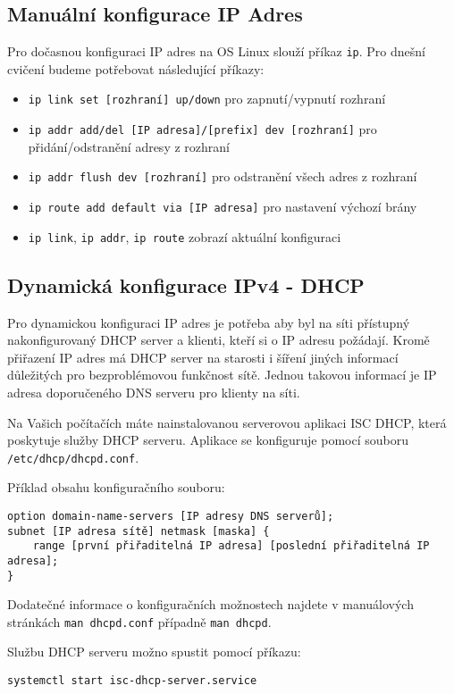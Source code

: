 \subsection{Manuální konfigurace IP Adres}\label{ip-manual}
Pro dočasnou konfiguraci IP adres na OS Linux slouží příkaz {\tt ip}. Pro
dnešní cvičení budeme potřebovat následující příkazy:
\begin{itemize}
    \item \verb_ip link set [rozhraní] up/down_ pro zapnutí/vypnutí rozhraní
    \item \verb_ip addr add/del [IP adresa]/[prefix] dev [rozhraní]_ pro
        přidání/odstranění adresy z rozhraní
    \item \verb_ip addr flush dev [rozhraní]_ pro odstranění všech adres z
        rozhraní
    \item \verb_ip route add default via [IP adresa]_ pro nastavení výchozí
        brány
    \item \verb_ip link_, \verb_ip addr_, \verb_ip route_ zobrazí aktuální
        konfiguraci
\end{itemize}

\subsection{Dynamická konfigurace IPv4 - DHCP}\label{dhcp}
Pro dynamickou konfiguraci IP adres je potřeba aby byl na síti přístupný
nakonfigurovaný DHCP server a klienti, kteří si o IP adresu požádají. Kromě
přiřazení IP adres má DHCP server na starosti i šíření jiných informací
důležitých pro bezproblémovou funkčnost sítě. Jednou takovou informací je IP
adresa doporučeného DNS serveru pro klienty na síti.

Na Vašich počítačích máte nainstalovanou serverovou aplikaci ISC DHCP, která
poskytuje služby DHCP serveru. Aplikace se konfiguruje pomocí souboru
\verb_/etc/dhcp/dhcpd.conf_.

Příklad obsahu konfiguračního souboru:
\begin{verbatim}
option domain-name-servers [IP adresy DNS serverů];
subnet [IP adresa sítě] netmask [maska] {
    range [první přiřaditelná IP adresa] [poslední přiřaditelná IP adresa];
}
\end{verbatim}
Dodatečné informace o konfiguračních možnostech najdete v manuálových stránkách
{\tt man dhcpd.conf} případně {\tt man dhcpd}.

Službu DHCP serveru možno spustit pomocí příkazu:
\begin{verbatim}
systemctl start isc-dhcp-server.service
\end{verbatim}

